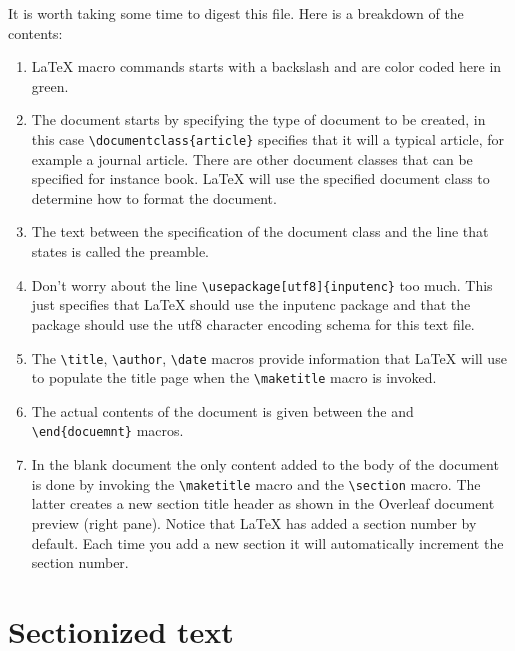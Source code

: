 It is worth taking some time to digest this file. Here is a breakdown of the contents:

\begin{enumerate}
    \item \LaTeX{} macro commands starts with a backslash and are color coded here in green.
    \item The document starts by specifying the type of document to be created, in this case \verb|\documentclass{article}| specifies that it will a typical article, for example a journal article. There are other document classes that can be specified for instance book. \LaTeX{} will use the specified document class to determine how to format the document.
    \item The text between the specification of the document  class and the line that states \verb|| is called the preamble. 
    \item Don't worry about the  line \verb|\usepackage[utf8]{inputenc}| too much. This just specifies that \LaTeX{} should use the inputenc package and that the package should use the utf8 character encoding schema for this text file.
    \item The \verb|\title|, \verb|\author|, \verb|\date| macros provide information that \LaTeX{} will use to populate the title page when the \verb|\maketitle| macro is invoked.
    \item The actual contents of the document is given between the \verb|| and \verb|\end{docuemnt}| macros. 
    \item In the blank document the only content added to the body of the document is done by invoking the \verb|\maketitle| macro and the \verb|\section| macro. The latter creates a new section title header as shown in the Overleaf document preview (right pane). Notice that \LaTeX{} has added a section number by default. Each time you add a new section it will automatically increment the section number.
\end{enumerate}

\section{Sectionized text}

